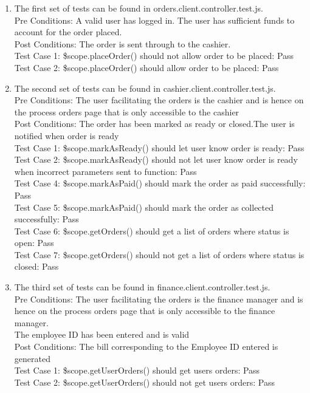 \documentclass[a4paper,12pt]{report}
\begin{document}
\begin{enumerate}

\item The first set of tests can be found in orders.client.controller.test.js.\\
Pre Conditions: A valid user has logged in. The user has sufficient funds to account for the order placed.\\
Post Conditions: The order is sent through to the cashier. \\
Test Case 1: \$scope.placeOrder() should not allow order to be placed: Pass\\
Test Case 2: \$scope.placeOrder() should allow order to be placed: Pass\\

\item The second set of tests can be found in cashier.client.controller.test.js.\\
Pre Conditions: The user facilitating the orders is the cashier and is hence on the process orders page that is only accessible to the cashier\\
Post Conditions: The order has been marked as ready or closed.The user is notified when order is ready\\
Test Case 1: \$scope.markAsReady() should let user know order is ready: Pass\\
Test Case 2: \$scope.markAsReady() should not let user know order is ready when incorrect parameters sent to function: Pass \\
Test Case 4: \$scope.markAsPaid() should  mark the order as paid successfully: Pass \\
Test Case 5: \$scope.markAsPaid() should  mark the order as collected successfully: Pass \\
Test Case 6: \$scope.getOrders() should get a list of orders where status is open: Pass \\
Test Case 7: \$scope.getOrders() should not get a list of orders where status is closed: Pass \\

\item The third set of tests can be found in finance.client.controller.test.js.\\
Pre Conditions: The user facilitating the orders is the finance manager and is hence on the process orders page that is only accessible to the finance manager. \\ The employee ID has been entered and is valid\\
Post Conditions: The bill corresponding to the Employee ID entered is generated\\
Test Case 1: \$scope.getUserOrders() should get users orders: Pass\\
Test Case 2: \$scope.getUserOrders() should not get users orders: Pass \\

\end{enumerate}
\end{document}
